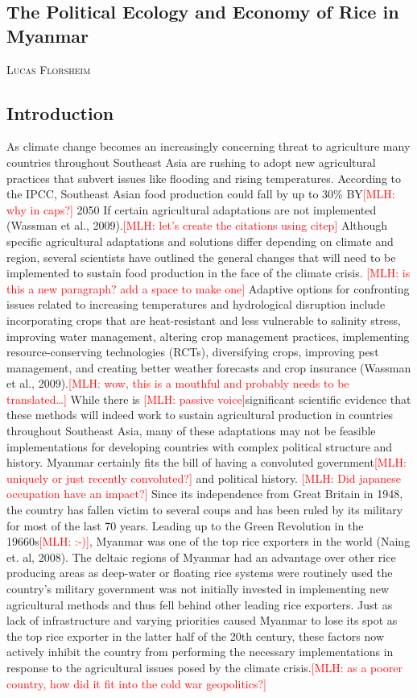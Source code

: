 \documentclass{book}\usepackage{knitr}
\makeatletter
\newcommand{\red}[1]{\textcolor{red}{[MLH: #1]}}
\newcommand{\chapterauthor}[1]{%
  {\parindent0pt\vspace*{-25pt}%
  \linespread{1.1}\large\scshape#1%
  \par\nobreak\vspace*{35pt}}
  \@afterheading%
}
\makeatother
\begin{document}
\begin{knitrout}
\begin{kframe}
{\chapter{The Political Ecology and Economy of Rice in Myanmar}

\chapterauthor{Lucas Florsheim}

\section{Introduction}

As climate change becomes an increasingly concerning threat to agriculture many countries throughout Southeast Asia are rushing to adopt new agricultural practices that subvert issues like flooding and rising temperatures. According to the IPCC, Southeast Asian food production could fall by up to 30\% BY\red{why in caps?} 2050 If certain agricultural adaptations are not implemented (Wassman et al., 2009).\red{let's create the citations using citep{}} Although specific agricultural adaptations and solutions differ depending on climate and region, several scientists have outlined the general changes that will need to be implemented to sustain food production in the face of the climate crisis. \red{is this a new paragraph? add a space to make one}
Adaptive options for confronting issues related to increasing temperatures and hydrological disruption include incorporating crops that are heat-resistant and less vulnerable to salinity stress, improving water management, altering crop management practices, implementing resource-conserving technologies (RCTs), diversifying crops, improving pest management, and creating better weather forecasts and crop insurance (Wassman et al., 2009).\red{wow, this is a mouthful and probably needs to be translated\ldots} While there is \red{passive voice}significant scientific evidence that these methods will indeed work to sustain agricultural production in countries throughout Southeast Asia, many of these adaptations may not be feasible implementations for developing countries with complex political structure and history. 
Myanmar certainly fits the bill of having a convoluted government\red{uniquely or just recently convoluted?} and political history. \red{Did japanese occupation have an impact?} Since its independence from Great Britain in 1948, the country has fallen victim to several coups and has been ruled by its military for most of the last 70 years. Leading up to the Green Revolution in the 19660s\red{:-)}, Myanmar was one of the top rice exporters in the world (Naing et. al, 2008). The deltaic regions of Myanmar had an advantage over other rice producing areas as deep-water or floating rice systems were routinely used the country’s military government was not initially invested in implementing new agricultural methods and thus fell behind other leading rice exporters. Just as lack of infrastructure and varying priorities caused Myanmar to lose its spot as the top rice exporter in the latter half of the 20th century, these factors now actively inhibit the country from performing the necessary implementations in response to the agricultural issues posed by the climate crisis.\red{as a poorer country, how did it fit into the cold war geopolitics?} 
}
\end{kframe}
\end{knitrout}
\end{document}
